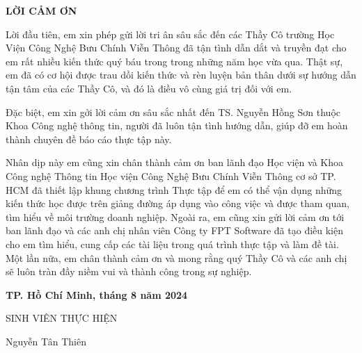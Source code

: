 \documentclass[report.tex]{subfiles}
\begin{document}

\begin{center}
    \textbf{LỜI CẢM ƠN}
\end{center}

Lời đầu tiên, em xin phép gửi lời tri ân sâu sắc đến các Thầy Cô trường Học Viện
Công Nghệ Bưu Chính Viễn Thông đã tận tình dẫn dắt và truyền đạt cho em rất nhiều kiến
thức quý báu trong trong những năm học vừa qua.
Thật sự, em đã có cơ hội được trau dồi kiến thức và rèn luyện bản thân dưới sự hướng dẫn tận tâm của các Thầy Cô, và đó là điều
vô cùng giá trị đối với em.

Đặc biệt, em xin gởi lời cảm ơn sâu sắc nhất đến TS. Nguyễn Hồng Sơn thuộc Khoa Công nghệ thông tin, người đã luôn tận tình hướng dẫn, giúp đỡ em hoàn thành chuyên đề báo cáo thực tập này.

Nhân dịp này em cũng xin chân thành cảm ơn ban lãnh đạo Học viện và Khoa Công nghệ Thông tin Học viện Công Nghệ Bưu Chính Viễn Thông cơ sở TP. HCM
đã thiết lập khung chương trình Thực tập để em có thể vận dụng những kiến thức học được trên giảng đường áp dụng vào công việc và được tham quan, tìm hiểu về môi trường doanh nghiệp.
Ngoài ra, em cũng xin gửi lời cảm ơn tới ban lãnh đạo và các anh chị nhân viên Công ty FPT Software đã tạo điều kiện cho em tìm hiểu, cung cấp các tài liệu trong quá trình thực tập và làm đề tài.
Một lần nữa, em chân thành cảm ơn và mong rằng quý Thầy Cô và các anh chị sẽ luôn tràn đầy niềm vui và thành công trong sự nghiệp.

\begin{flushright}
\textbf{TP. Hồ Chí Minh, tháng 8 năm 2024}
\end{flushright}

\begin{flushright}
SINH VIÊN THỰC HIỆN
\end{flushright}

\par\null\par

\begin{flushright}
Nguyễn Tân Thiên
\end{flushright}

\pagebreak
\end{document}
